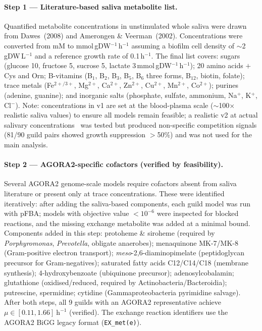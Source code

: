 \documentclass[11pt,a4paper]{article}
\begin{document}
\paragraph{Step 1 — Literature-based saliva metabolite list.}
Quantified metabolite concentrations in unstimulated whole saliva were drawn from
Dawes~(2008) and Amerongen \& Veerman~(2002).
Concentrations were converted from mM to mmol\,gDW$^{-1}$\,h$^{-1}$ assuming a
biofilm cell density of $\sim$2\,gDW\,L$^{-1}$ and a reference growth rate
of 0.1\,h$^{-1}$.
The final list covers:
sugars (glucose 10, fructose 5, sucrose 5, lactate 3\,mmol\,gDW$^{-1}$\,h$^{-1}$);
20 amino acids $+$ Cys and Orn;
B-vitamins (B$_1$, B$_2$, B$_3$, B$_5$, B$_6$ three forms, B$_{12}$, biotin, folate);
trace metals (Fe$^{2+/3+}$, Mg$^{2+}$, Ca$^{2+}$, Zn$^{2+}$, Cu$^{2+}$, Mn$^{2+}$, Co$^{2+}$);
purines (adenine, guanine); and inorganic salts (phosphate, sulfate, ammonium, Na$^+$, K$^+$, Cl$^-$).
Note: concentrations in v1 are set at the blood-plasma scale ($\sim$100$\times$ realistic
saliva values) to ensure all models remain feasible; a realistic v2 at actual salivary
concentrations~\citep{tenovuo1998} was tested but produced non-specific competition signals
(81/90 guild pairs showed growth suppression $>$50\%) and was not used for the main analysis.

\paragraph{Step 2 — AGORA2-specific cofactors (verified by feasibility).}
Several AGORA2 genome-scale models require cofactors absent from saliva literature or
present only at trace concentrations.
These were identified iteratively: after adding the saliva-based components, each guild
model was run with pFBA; models with objective value $<10^{-6}$ were inspected for
blocked reactions, and the missing exchange metabolite was added at a minimal bound.
Components added in this step:
protoheme \& siroheme (required by \textit{Porphyromonas}, \textit{Prevotella}, obligate anaerobes);
menaquinone MK-7/MK-8 (Gram-positive electron transport);
\textit{meso}-2,6-diaminopimelate (peptidoglycan precursor for Gram-negatives);
saturated fatty acids C12/C14/C18 (membrane synthesis);
4-hydroxybenzoate (ubiquinone precursor);
adenosylcobalamin;
glutathione (oxidised/reduced, required by Actinobacteria/Bacteroidia);
putrescine, spermidine;
cytidine (Gammaproteobacteria pyrimidine salvage).
After both steps, all 9 guilds with an AGORA2 representative achieve
$\mu\in[0.11, 1.66]\ \text{h}^{-1}$ (verified).
The exchange reaction identifiers use the AGORA2 BiGG legacy format
(\texttt{EX\_met(e)}).
\end{document}
